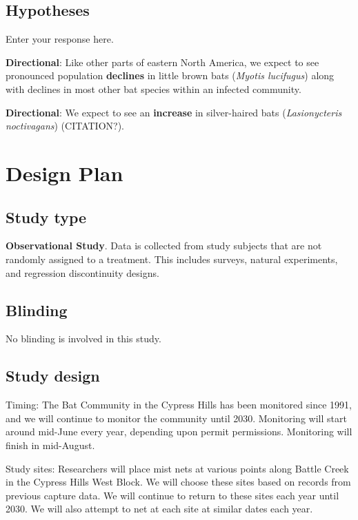 \documentclass[]{article}
\begin{document}
\hypertarget{hypotheses}{%
\subsection{Hypotheses}\label{hypotheses}}

Enter your response here.

\textbf{Directional}: Like other parts of eastern North America, we
expect to see pronounced population \textbf{declines} in little brown
bats (\emph{Myotis lucifugus}) along with declines in most other bat
species within an infected community.

\textbf{Directional}: We expect to see an \textbf{increase} in
silver-haired bats (\emph{Lasionycteris noctivagans}) (CITATION?).

\hypertarget{design-plan}{%
\section{Design Plan}\label{design-plan}}

\hypertarget{study-type}{%
\subsection{Study type}\label{study-type}}

\textbf{Observational Study}. Data is collected from study subjects that
are not randomly assigned to a treatment. This includes surveys, natural
experiments, and regression discontinuity designs.

\hypertarget{blinding}{%
\subsection{Blinding}\label{blinding}}

No blinding is involved in this study.

\hypertarget{study-design}{%
\subsection{Study design}\label{study-design}}

Timing: The Bat Community in the Cypress Hills has been monitored since
1991, and we will continue to monitor the community until 2030.
Monitoring will start around mid-June every year, depending upon permit
permissions. Monitoring will finish in mid-August.

Study sites: Researchers will place mist nets at various points along
Battle Creek in the Cypress Hills West Block. We will choose these sites
based on records from previous capture data. We will continue to return
to these sites each year until 2030. We will also attempt to net at each
site at similar dates each year.
\end{document}
